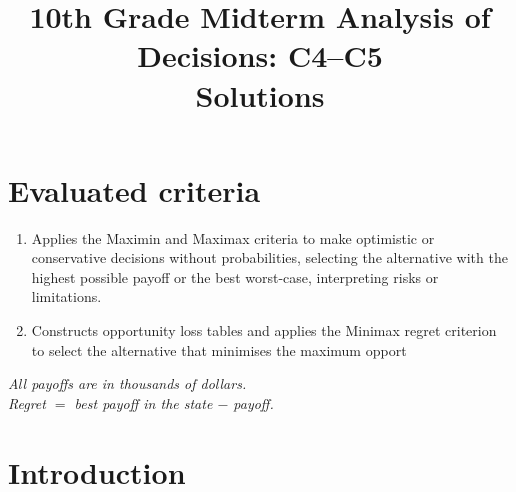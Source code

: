 \makeatletter
{}
\makeatother






\title{10th Grade Midterm Analysis of Decisions: C4--C5\\Solutions}
\author{}
\date{}


	\maketitle
	
	\setcounter{tocdepth}{1}
	\setcounter{secnumdepth}{2}
	
	\label{toc}
	\tableofcontents
	
	\section*{Evaluated criteria}
	\begin{enumerate}[label=\textbf{C\arabic*}, start=4]
		\item Applies the Maximin and Maximax criteria to make optimistic or conservative decisions without probabilities, selecting the alternative with the highest possible payoff or the best worst-case, interpreting risks or limitations.
		\item Constructs opportunity loss tables and applies the Minimax regret criterion to select the alternative that minimises the maximum opport
	\end{enumerate}
	
	\begin{center}
		\textit{All payoffs are in thousands of dollars.}\\
		\textit{Regret \(=\) best payoff in the state \(-\) payoff.}
	\end{center}
	
	\section{Introduction}
	\label{sec:introduction}
\label{tone:legend}

